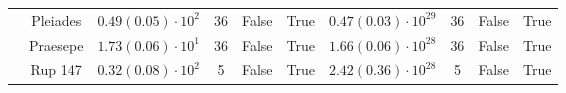 \begin{tabular}{lccccccccr}
          & Pleiades &    $0.49\left(0.05\right)\cdot 10^{2}$ &             36 &           False &            True &        $0.47\left(0.03\right)\cdot 10^{29}$ &               36 &             False &              True \\
          & Praesepe &    $1.73\left(0.06\right)\cdot 10^{1}$ &             36 &           False &            True &        $1.66\left(0.06\right)\cdot 10^{28}$ &               36 &             False &              True \\
          & Rup 147 &    $0.32\left(0.08\right)\cdot 10^{2}$ &              5 &           False &            True &        $2.42\left(0.36\right)\cdot 10^{28}$ &                5 &             False &              True \\
\hline

\end{tabular}
